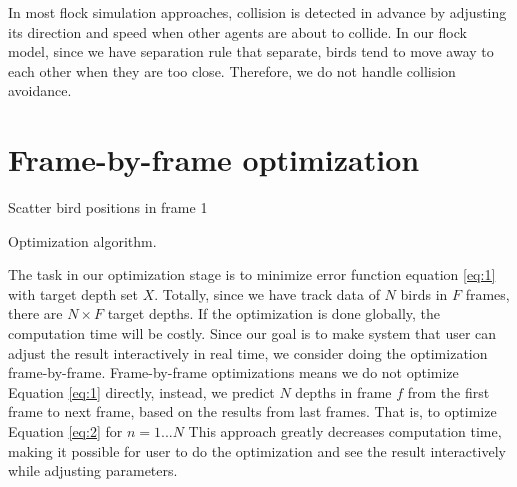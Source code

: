 In most flock simulation approaches, collision is detected in advance by adjusting its direction and speed when other agents are about to collide. In our flock model, since we have separation rule that separate, birds tend to move away to each other when they are too close. Therefore, we do not handle collision avoidance.


\section{Frame-by-frame optimization}

\begin{algorithm}[h]
\SetAlgoLined
{}
Scatter bird positions in frame 1 \;

\caption{Optimization algorithm.}
\label{algo:optimization}
\end{algorithm}



The task in our optimization stage is to minimize error function equation \ref{eq:1} with target depth set $X$. Totally, since we have track data of $N$ birds in $F$ frames, there are $N{\times}F$ target depths. If the optimization is done globally, the computation time will be costly. Since our goal is to make system that user can adjust the result interactively in real time, we consider doing the optimization frame-by-frame. Frame-by-frame optimizations means we do not optimize Equation \ref{eq:1} directly, instead, we predict $N$ depths in frame $f$ from the first frame to next frame, based on the results from last frames. That is, to optimize Equation \ref{eq:2} for $n=1...N$ This approach greatly decreases computation time, making it possible for user to do the optimization and see the result interactively while adjusting parameters.


